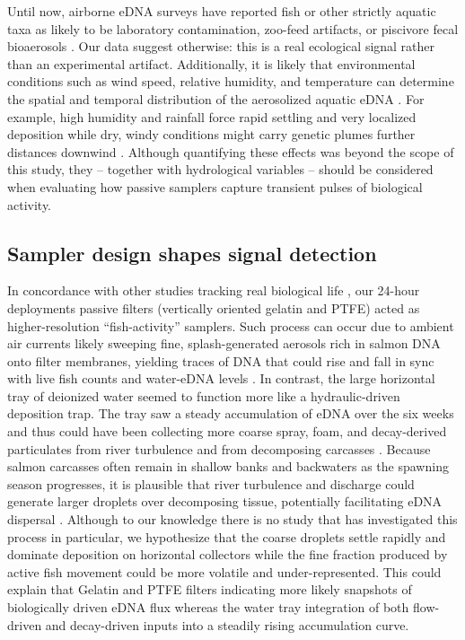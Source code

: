 \documentclass{article}
\begin{document}
Until now, airborne eDNA surveys have reported fish or other strictly aquatic taxa as likely to be laboratory contamination, zoo-feed artifacts, or piscivore fecal bioaerosols \cite{klepke2022, lynggaard2023, sullivan2023, lynggaard2022}. Our data suggest otherwise: this is a real ecological signal rather than an experimental artifact. Additionally, it is likely that environmental conditions such as wind speed, relative humidity, and temperature can determine the spatial and temporal distribution of the aerosolized aquatic eDNA \cite{abrego2024, giolai2024}. For example, high humidity and rainfall force rapid settling and very localized deposition while dry, windy conditions might carry genetic plumes further distances downwind \cite{galban2021,maki2023}. Although quantifying these effects was beyond the scope of this study, they -- together with hydrological variables -- should be considered when evaluating how passive samplers capture transient pulses of biological activity.

\subsection{Sampler design shapes signal detection}
In concordance with other studies tracking real biological life \cite{jager2025}, our 24-hour deployments passive filters (vertically oriented gelatin and PTFE) acted as higher-resolution “fish-activity” samplers. Such process can occur due to ambient air currents likely sweeping fine, splash-generated aerosols rich in salmon DNA onto filter membranes, yielding traces of DNA that could rise and fall in sync with live fish counts and water-eDNA levels \cite{blanchard1980}. In contrast, the large horizontal tray of deionized water seemed to function more like a hydraulic-driven deposition trap. The tray saw a steady accumulation of eDNA over the six weeks and thus could have been collecting more coarse spray, foam, and decay-derived particulates from river turbulence and from decomposing carcasses \cite{hinds2022, prather2013}. Because salmon carcasses often remain in shallow banks and backwaters as the spawning season progresses, it is plausible that river turbulence and discharge could generate larger droplets over decomposing tissue, potentially facilitating eDNA dispersal \cite{wood2021, herman2023}. Although to our knowledge there is no study that has investigated this process in particular, we hypothesize that the coarse droplets settle rapidly and dominate deposition on horizontal collectors while the fine fraction produced by active fish movement could be more volatile and under-represented. This could explain that Gelatin and PTFE filters indicating more likely snapshots of biologically driven eDNA flux whereas the water tray integration of both flow-driven and decay-driven inputs into a steadily rising accumulation curve.
\end{document}
